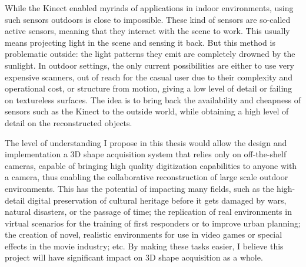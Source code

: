 While the Kinect enabled myriads of applications in indoor environments, using such sensors outdoors is close to impossible. These kind of sensors are so-called active sensors, meaning that they interact with the scene to work. This usually means projecting light in the scene and sensing it back. But this method is problematic outside: the light patterns they emit are completely drowned by the sunlight. In outdoor settings, the only current possibilities are either to use very expensive scanners, out of reach for the casual user due to their complexity and operational cost, or structure from motion, giving a low level of detail or failing on textureless surfaces. The idea is to bring back the availability and cheapness of sensors such as the Kinect to the outside world, while obtaining a high level of detail on the reconstructed objects.

The level of understanding I propose in this thesis would allow the design and implementation a 3D shape acquisition system that relies only on off-the-shelf cameras, capable of bringing high quality digitization capabilities to anyone with a camera, thus enabling the collaborative reconstruction of large scale outdoor environments. This has the potential of impacting many fields, such as the high-detail digital preservation of cultural heritage before it gets damaged by wars, natural disasters, or the passage of time; the replication of real environments in virtual scenarios for the training of first responders or to improve urban planning; the creation of novel, realistic environments for use in video games or special effects in the movie industry; etc. By making these tasks easier, I believe this project will have significant impact on 3D shape acquisition as a whole.